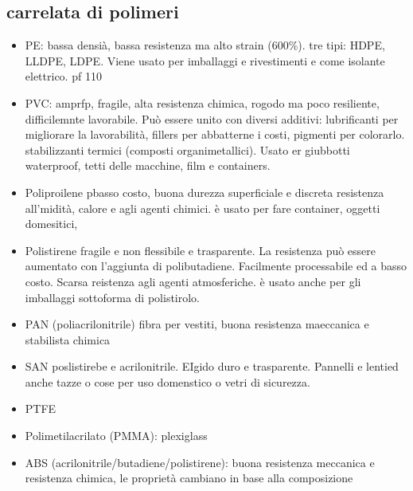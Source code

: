 \subsection{carrelata di polimeri}
    \begin{itemize}
        \item PE: bassa densià, bassa resistenza ma alto strain (600\%). tre tipi: HDPE, LLDPE, LDPE. Viene usato per imballaggi e rivestimenti e come isolante elettrico. pf 110
        \item PVC: amprfp, fragile, alta resistenza chimica, rogodo ma poco resiliente, difficilemnte lavorabile. Può essere unito con diversi additivi: lubrificanti per migliorare la lavorabilità, fillers per abbatterne i costi, pigmenti per colorarlo. stabilizzanti termici (composti organimetallici). Usato er giubbotti waterproof, tetti delle macchine, film e containers.
        \item Poliproilene pbasso costo, buona durezza superficiale e discreta resistenza all'midità, calore e agli agenti chimici. è usato per fare container, oggetti domesitici, 
        \item Polistirene fragile e non flessibile e trasparente. La resistenza può essere aumentato con l'aggiunta di polibutadiene. Facilmente processabile ed a basso costo. Scarsa reistenza agli agenti atmosferiche. è usato anche per gli imballaggi sottoforma di polistirolo.
        \item PAN (poliacrilonitrile) fibra per vestiti, buona resistenza maeccanica e stabilista chimica
        \item SAN poslistirebe e acrilonitrile.  EIgido duro e trasparente. Pannelli e lentied anche tazze o cose per uso domenstico o vetri di sicurezza.
        \item PTFE 
        \item Polimetilacrilato (PMMA): plexiglass 
        \item ABS (acrilonitrile/butadiene/polistirene): buona resistenza meccanica e resistenza chimica, le proprietà cambiano in base alla composizione
    \end{itemize}

